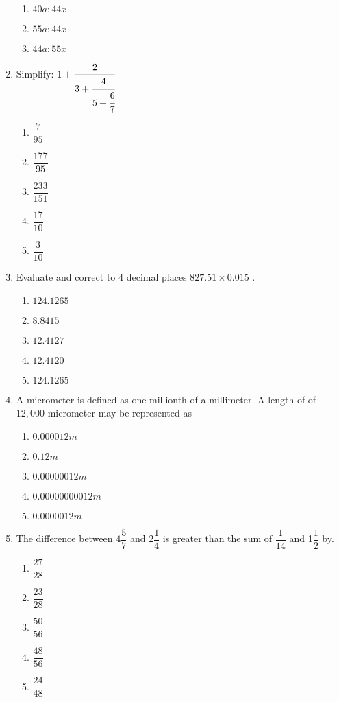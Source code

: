 \begin{multicols}{2}
\begin{enumerate}[label={\arabic*.}]
\begin{enumerate}[label={\Alph*.}]
    \item \(40a:44x\)
    \item \(55a:44x\)
    \item \(44a:55x\)
    \end{enumerate}
\item Simplify: \(1 + {\cfrac{2}{3 + \cfrac{4}{5+ \cfrac{6}{7}}}}\)
    \begin{enumerate}[label={\Alph*.}]
    \item \(\dfrac{7}{95}\)
    \item \(\dfrac{177}{95}\)
    \item \(\dfrac{233}{151}\)
    \item \(\dfrac{17}{10}\)
    \item \(\dfrac{3}{10}\)
    \end{enumerate}
\item Evaluate and correct to \(4\) decimal places \(827.51 \times 0.015\) .
    \begin{enumerate}[label={\Alph*.}]
    \item \(124.1265\)
    \item \(8.8415\)
    \item \(12.4127\)
    \item \(12.4120\)
    \item \(124.1265\)
    \end{enumerate}
\item A micrometer is defined as one millionth of a millimeter. A length of of \(12,000\) micrometer may be represented as
    \begin{enumerate}[label={\Alph*.}]
    \item \(0.000012m\)
    \item \(0.12m\)
    \item \(0.00000012m\)
    \item \(0.00000000012m\)
    \item \(0.0000012m\)
    \end{enumerate}
\item The difference between \(4{\dfrac{5}{7}}\) and \(2{\dfrac{1}{4}}\) is greater than the sum of \(\dfrac{1}{14}\) and 1\(\dfrac{1}{2}\) by.
    \begin{enumerate}[label={\Alph*.}]
    \item \(\dfrac{27}{28}\)
    \item \(\dfrac{23}{28}\)
    \item \(\dfrac{50}{56}\)
    \item \(\dfrac{48}{56}\)
    \item \(\dfrac{24}{48}\)

\end{enumerate}
\end{enumerate}
\end{multicols}

